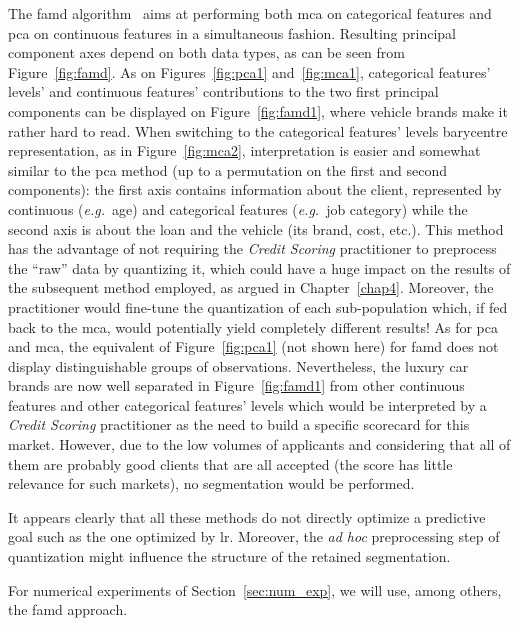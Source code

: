 The \gls{famd} algorithm~\cite{pages2014multiple} aims at performing both \gls{mca} on categorical features and \gls{pca} on continuous features in a simultaneous fashion. Resulting principal component axes depend on both data types, as can be seen from Figure~\ref{fig:famd}. As on Figures~\ref{fig:pca1} and~\ref{fig:mca1}, categorical features' levels' and continuous features' contributions to the two first principal components can be displayed on Figure~\ref{fig:famd1}, where vehicle brands make it rather hard to read. When switching to the categorical features' levels barycentre representation, as in Figure~\ref{fig:mca2}, interpretation is easier and somewhat similar to the \gls{pca} method (up to a permutation on the first and second components): the first axis contains information about the client, represented by continuous (\textit{e.g.}\ age) and categorical features (\textit{e.g.}\ job category) while the second axis is about the loan and the vehicle (its brand, cost, etc.).
This method has the advantage of not requiring the \textit{Credit Scoring} practitioner to preprocess the ``raw'' data by quantizing it, which could have a huge impact on the results of the subsequent method employed, as argued in Chapter~\ref{chap4}. Moreover, the practitioner would fine-tune the quantization of each sub-population which, if fed back to the \gls{mca}, would potentially yield completely different results! As for \gls{pca} and \gls{mca}, the equivalent of Figure~\ref{fig:pca1} (not shown here) for \gls{famd} does not display distinguishable groups of observations. Nevertheless, the luxury car brands are now well separated in Figure~\ref{fig:famd1} from other continuous features and other categorical features' levels which would be interpreted by a \textit{Credit Scoring} practitioner as the need to build a specific scorecard for this market. However, due to the low volumes of applicants and considering that all of them are probably good clients that are all accepted (the score has little relevance for such markets), no segmentation would be performed.

\medskip

It appears clearly that all these methods do not directly optimize a predictive goal such as the one optimized by \gls{lr}. Moreover, the \textit{ad hoc} preprocessing step of quantization might influence the structure of the retained segmentation. 

For numerical experiments of Section~\ref{sec:num_exp}, we will use, among others, the \gls{famd} approach.

